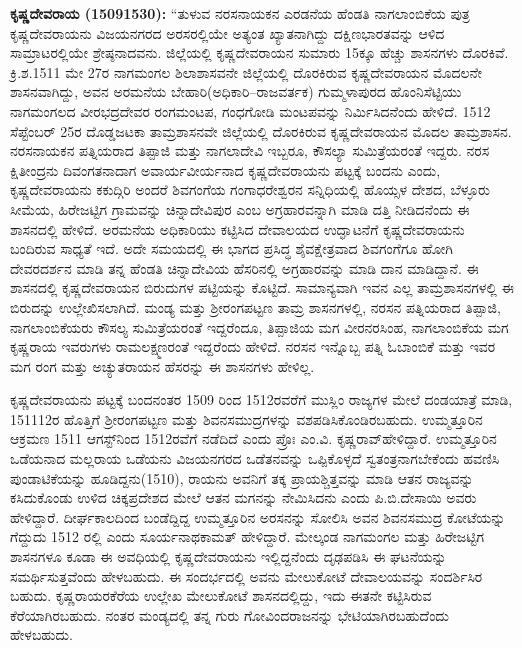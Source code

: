 \textbf{ ಕೃಷ್ಣದೇವರಾಯ (15091530):} “ತುಳುವ ನರಸನಾಯಕನ ಎರಡನೆಯ ಹೆಂಡತಿ ನಾಗಲಾಂಬಿಕೆಯ ಪುತ್ರ ಕೃಷ್ಣದೇವರಾಯನು ವಿಜಯನಗರದ ಅರಸರಲ್ಲಿಯೇ ಅತ್ಯಂತ ಖ್ಯಾತನಾಗಿದ್ದು ದಕ್ಷಿಣಭಾರತವನ್ನು ಆಳಿದ ಸಾಮ್ರಾಟರಲ್ಲಿಯೇ ಶ್ರೇಷ್ಠನಾದವನು. ಜಿಲ್ಲೆಯಲ್ಲಿ ಕೃಷ್ಣದೇವರಾಯನ ಸುಮಾರು 15ಕ್ಕೂ ಹೆಚ್ಚು ಶಾಸನಗಳು ದೊರಕಿವೆ. ಕ್ರಿ.ಶ.1511 ಮೇ 27ರ ನಾಗಮಂಗಲ ಶಿಲಾಶಾಸವನೇ ಜಿಲ್ಲೆಯಲ್ಲಿ ದೊರಕಿರುವ ಕೃಷ್ಣದೇವರಾಯನ ಮೊದಲನೇ ಶಾಸನವಾಗಿದ್ದು, ಅವನ ಅರಮನೆಯ ಬೇಹಾರಿ(ಅಧಿಕಾರಿ–ರಾಜವರ್ತಕ) ಗುಮ್ಮಳಾಪುರದ ಹೊಂನಿಸೆಟ್ಟಿಯು ನಾಗಮಂಗಲದ ವೀರಭದ್ರದೇವರ ರಂಗಮಂಟಪ, ಗಂಧಗೋಡಿ ಮಂಟಪವನ್ನು ನಿರ್ಮಿಸಿದನೆಂದು ಹೇಳಿದೆ. 1512 ಸೆಪ್ಟೆಂಬರ್​ 25ರ ದೊಡ್ಡಜಟಕಾ ತಾಮ್ರಶಾಸನವೇ ಜಿಲ್ಲೆಯಲ್ಲಿ ದೊರಕಿರುವ ಕೃಷ್ಣದೇವರಾಯನ ಮೊದಲ ತಾಮ್ರಶಾಸನ. ನರಸನಾಯಕನ ಪತ್ನಿಯರಾದ ತಿಪ್ಪಾಜಿ ಮತ್ತು ನಾಗಲಾದೇವಿ ಇಬ್ಬರೂ, ಕೌಸಲ್ಯಾ ಸುಮಿತ್ರೆಯರಂತೆ ಇದ್ದರು. ನರಸ ಕ್ಷಿತೀಂದ್ರನು ದಿವಂಗತನಾದಾಗ ಅವಾರ್ಯವೀರ್ಯನಾದ ಕೃಷ್ಣದೇವರಾಯನು ಪಟ್ಟಕ್ಕೆ ಬಂದನು ಎಂದು, ಕೃಷ್ಣದೇವರಾಯನು ಕಕುದ್ಗಿರಿ ಅಂದರೆ ಶಿವಗಂಗೆಯ ಗಂಗಾಧರೇಶ್ವರನ ಸನ್ನಿಧಿಯಲ್ಲಿ ಹೊಯ್ಸಳ ದೇಶದ, ಬೆಳ್ಳೂರು ಸೀಮೆಯ, ಹಿರೇಜಟ್ಟಿಗ ಗ್ರಾಮವನ್ನು ಚಿನ್ನಾದೇವಿಪುರ ಎಂಬ ಅಗ್ರಹಾರವನ್ನಾಗಿ ಮಾಡಿ ದತ್ತಿ ನೀಡಿದನೆಂದು ಈ ಶಾಸನದಲ್ಲಿ ಹೇಳಿದೆ. ಅರಮನೆಯ ಅಧಿಕಾರಿಯು ಕಟ್ಟಿಸಿದ ದೇವಾಲಯದ ಉದ್ಘಾಟನೆಗೆ ಕೃಷ್ಣದೇವರಾಯನು ಬಂದಿರುವ ಸಾಧ್ಯತೆ ಇದೆ. ಅದೇ ಸಮಯದಲ್ಲಿ ಈ ಭಾಗದ ಪ್ರಸಿದ್ಧ ಶೈವಕ್ಷೇತ್ರವಾದ ಶಿವಗಂಗೆಗೂ ಹೋಗಿ ದೇವರದರ್ಶನ ಮಾಡಿ ತನ್ನ ಹೆಂಡತಿ ಚಿನ್ನಾದೇವಿಯ ಹೆಸರಿನಲ್ಲಿ ಅಗ್ರಹಾರವನ್ನು ಮಾಡಿ ದಾನ ಮಾಡಿದ್ದಾನೆ. ಈ ಶಾಸನದಲ್ಲಿ ಕೃಷ್ಣದೇವರಾಯನ ಬಿರುದುಗಳ ಪಟ್ಟಿಯನ್ನು ಕೊಟ್ಟಿದೆ. ಸಾಮಾನ್ಯವಾಗಿ ಇವನ ಎಲ್ಲ ತಾಮ್ರಶಾಸನಗಳಲ್ಲಿ ಈ ಬಿರುದನ್ನು ಉಲ್ಲೇಖಿಸಲಾಗಿದೆ. ಮಂಡ್ಯ ಮತ್ತು ಶ‍್ರೀರಂಗಪಟ್ಟಣ ತಾಮ್ರ ಶಾಸನಗಳಲ್ಲಿ, ನರಸನ ಪತ್ನಿಯರಾದ ತಿಪ್ಪಾಜಿ, ನಾಗಲಾಂಬಿಕೆಯರು ಕೌಸಲ್ಯ ಸುಮಿತ್ರೆಯರಂತೆ ಇದ್ದರೆಂದೂ, ತಿಪ್ಪಾಜಿಯ ಮಗ ವೀರನರಸಿಂಹ, ನಾಗಲಾಂಬಿಕೆಯ ಮಗ ಕೃಷ್ಣರಾಯ ಇವರುಗಳು ರಾಮಲಕ್ಷ್ಮಣರಂತೆ ಇದ್ದರೆಂದು ಹೇಳಿದೆ. ನರಸನ ಇನ್ನೊಬ್ಬ ಪತ್ನಿ ಓಬಾಂಬಿಕೆ ಮತ್ತು ಇವರ ಮಗ ರಂಗ ಮತ್ತು ಅಚ್ಯುತರಾಯನ ಹೆಸರನ್ನು ಈ ಶಾಸನಗಳು ಹೇಳಿಲ್ಲ.

ಕೃಷ್ಣದೇವರಾಯನು ಪಟ್ಟಕ್ಕೆ ಬಂದನಂತರ 1509 ರಿಂದ 1512ರವರೆಗೆ ಮುಸ್ಲಿಂ ರಾಜ್ಯಗಳ ಮೇಲೆ ದಂಡಯಾತ್ರೆ ಮಾಡಿ, 151112ರ ಹೊತ್ತಿಗೆ ಶ‍್ರೀರಂಗಪಟ್ಟಣ ಮತ್ತು ಶಿವನಸಮುದ್ರಗಳನ್ನು ವಶಪಡಿಸಿಕೊಂಡಿರಬಹುದು. ಉಮ್ಮತ್ತೂರಿನ ಆಕ್ರಮಣ 1511 ಆಗಸ್ಟ್​ನಿಂದ 1512ರವೆಗೆ ನಡೆದಿದೆ ಎಂದು ಪ್ರೊಃ ಎಂ.ವಿ. ಕೃಷ್ಣರಾವ್​ ಹೇಳಿದ್ದಾರೆ. ಉಮ್ಮತ್ತೂರಿನ ಒಡೆಯನಾದ ಮಲ್ಲರಾಯ ಒಡೆಯನು ವಿಜಯನಗರದ ಒಡೆತನವನ್ನು ಒಪ್ಪಿಕೊಳ್ಳದೆ ಸ್ವತಂತ್ರನಾಗಬೇಕೆಂದು ಹವಣಿಸಿ ಪುಂಡಾಟಿಕೆಯನ್ನು ಹೂಡಿದ್ದನು(1510), ರಾಯನು ಅವನಿಗೆ ತಕ್ಕ ಪ್ರಾಯಶ್ಚಿತ್ತವನ್ನು ಮಾಡಿ ಆತನ ರಾಜ್ಯವನ್ನು ಕಸಿದುಕೊಂಡು ಉಳಿದ ಚಿಕ್ಕಪ್ರದೇಶದ ಮೇಲೆ ಆತನ ಮಗನನ್ನು ನೇಮಿಸಿದನು ಎಂದು ಪಿ.ಬಿ.ದೇಸಾಯಿ ಅವರು ಹೇಳಿದ್ದಾರೆ. ದೀರ್ಘಕಾಲದಿಂದ ಬಂಡೆದ್ದಿದ್ದ ಉಮ್ಮತ್ತೂರಿನ ಅರಸನನ್ನು ಸೋಲಿಸಿ ಅವನ ಶಿವನಸಮುದ್ರ ಕೋಟೆಯನ್ನು ಗೆದ್ದುದು 1512 ರಲ್ಲಿ ಎಂದು ಸೂರ್ಯನಾಥಕಾಮತ್​ ಹೇಳಿದ್ದಾರೆ. ಮೇಲ್ಕಂಡ ನಾಗಮಂಗಲ ಮತ್ತು ಹಿರೇಜಟ್ಟಿಗ ಶಾಸನಗಳೂ ಕೂಡಾ ಈ ಅವಧಿಯಲ್ಲಿ ಕೃಷ್ಣದೇವರಾಯನು ಇಲ್ಲಿದ್ದನೆಂದು ದೃಢಪಡಿಸಿ ಈ ಘಟನೆಯನ್ನು ಸಮರ್ಥಿಸುತ್ತವೆಂದು ಹೇಳಬಹುದು. ಈ ಸಂದರ್ಭದಲ್ಲಿ ಅವನು ಮೇಲುಕೋಟೆ ದೇವಾಲಯವನ್ನು ಸಂದರ್ಶಿಸಿರ ಬಹುದು. ಕೃಷ್ಣರಾಯರಕೆರೆಯ ಉಲ್ಲೇಖ ಮೇಲುಕೋಟೆ ಶಾಸನದಲ್ಲಿದ್ದು, ಇದು ಈತನೇ ಕಟ್ಟಿಸಿರುವ ಕೆರೆಯಾಗಿರಬಹುದು. ನಂತರ ಮಂಡ್ಯದಲ್ಲಿ ತನ್ನ ಗುರು ಗೋವಿಂದರಾಜನನ್ನು ಭೇಟಿಯಾಗಿರಬಹುದೆಂದು ಹೇಳಬಹುದು. 

